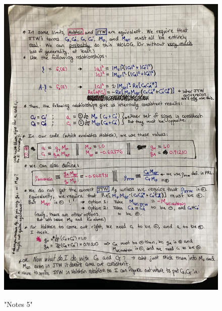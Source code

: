 \begin{figure}[htb]
	\centering
	{\includegraphics[width=.999\linewidth]
	{Figures/oldnotes_holstein_jtw/image5.jpg} }
	\caption{"Notes 5"}
	\label{fig:notes5}
\end{figure}
